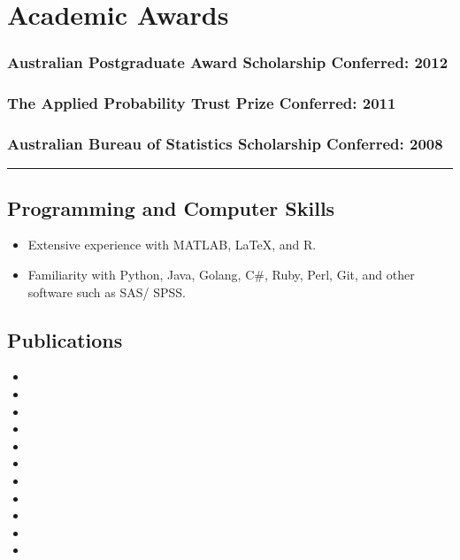 \documentclass[a4paper,12pt]{report}
\begin{document}
\section*{Academic Awards}

\subsubsection*{Australian Postgraduate Award Scholarship \hfill Conferred: 2012}

\subsubsection*{The Applied Probability Trust Prize \hfill Conferred: 2011}

\subsubsection*{Australian Bureau of Statistics Scholarship \hfill Conferred: 2008}

\vspace{0.4cm}
\hrule
\vspace{0.6cm}

\subsection*{Programming and Computer Skills}          

\begin{itemize}
	\item Extensive experience with MATLAB, \LaTeX, and R.
	\item Familiarity with Python, Java, Golang, C\#, Ruby, Perl, Git, and other software such as SAS/ SPSS. 
\end{itemize}



\subsection*{Publications}          

\begin{itemize}
	\item {}
	\item {}
	\item {}
	\item {}
	\item {}
	\item {}
	\item {}
	\item {}
	\item {}
	\item {}
	\item {}
\end{itemize}
\end{document}
